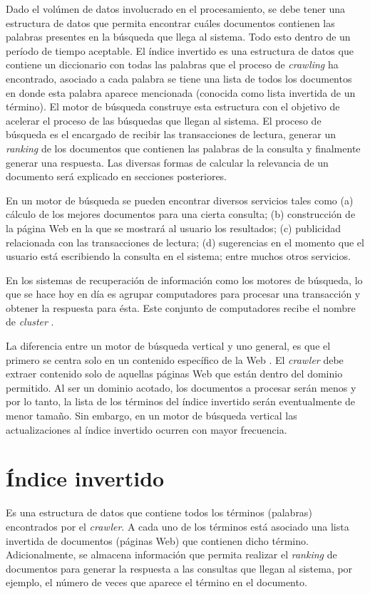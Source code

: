 Dado el volúmen de datos involucrado en el procesamiento, se debe tener una estructura de datos que permita encontrar cuáles documentos contienen las palabras presentes en la búsqueda que llega al sistema. Todo esto dentro de un período de tiempo aceptable. El índice invertido \citep{Zobel:2006} es una estructura de datos que contiene un diccionario con todas las palabras que el proceso de \textit{crawling} ha encontrado, asociado a cada palabra se tiene una lista de todos los documentos en donde esta palabra aparece mencionada (conocida como lista invertida de un término). El motor de búsqueda construye esta estructura con el objetivo de acelerar el proceso de las búsquedas que llegan al sistema. El proceso de búsqueda es el encargado de recibir las transacciones de lectura, generar un \textit{ranking} de los documentos que contienen las palabras de la consulta y finalmente generar una respuesta. Las diversas formas de calcular la relevancia de un documento será explicado en secciones posteriores.

En un motor de búsqueda se pueden encontrar diversos servicios tales como (a) cálculo de los mejores documentos para una cierta consulta; (b) construcción de la página Web en la que se mostrará al usuario los resultados; (c) publicidad relacionada con las transacciones de lectura; (d) sugerencias en el momento que el usuario está escribiendo la consulta en el sistema; entre muchos otros servicios.

En los sistemas de recuperación de información como los motores de búsqueda, lo que se hace hoy en día es agrupar computadores para procesar una transacción y obtener la respuesta para ésta. Este conjunto de computadores recibe el nombre de \textit{cluster} \citep{Dean:2009}.

La diferencia entre un motor de búsqueda vertical y uno general, es que el primero se centra solo en un contenido específico de la Web \citep{Gil-Costa:2013}. El \textit{crawler} debe extraer contenido solo de aquellas páginas Web que están dentro del dominio permitido. Al ser un dominio acotado, los documentos a procesar serán menos y por lo tanto, la lista de los términos del índice invertido serán eventualmente de menor tamaño. Sin embargo, en un motor de búsqueda vertical las actualizaciones al índice invertido ocurren con mayor frecuencia.

\section{\'Indice invertido}
\label{marco:ii}
Es una estructura de datos que contiene todos los términos (palabras) encontrados por el \textit{crawler}. A cada uno de los términos está asociado una lista invertida de documentos (páginas Web) que contienen dicho término. Adicionalmente, se almacena información que permita realizar el \textit{ranking} de documentos para generar la respuesta a las consultas que llegan al sistema, por ejemplo, el número de veces que aparece el término en el documento.

